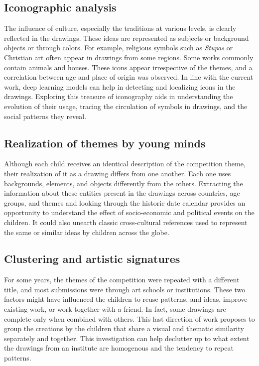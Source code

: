 \subsection{Iconographic analysis}
The influence of culture, especially the traditions at various levels, is clearly reflected in the drawings. These ideas are represented as subjects or background objects or through colors. For example, religious symbols such as \textit{Stupas} or Christian art often appear in drawings from some regions. Some works commonly contain animals and houses. These icons appear irrespective of the themes, and a correlation between age and place of origin was observed. In line with the current work, deep learning models can help in detecting and localizing icons in the drawings. Exploring this treasure of iconography aids in understanding the evolution of their usage, tracing the circulation of symbols in drawings, and the social patterns they reveal. 

\subsection{Realization of themes by young minds}
Although each child receives an identical description of the competition theme, their realization of it as a drawing differs from one another. Each one uses backgrounds, elements, and objects differently from the others. Extracting the information about these entities present in the drawings across countries, age groups, and themes and looking through the historic date calendar provides an opportunity to understand the effect of socio-economic and political events on the children. It could also unearth classic cross-cultural references used to represent the same or similar ideas by children across the globe.

\subsection{Clustering and artistic signatures}
For some years, the themes of the competition were repeated with a different title, and most submissions were through art schools or institutions. These two factors might have influenced the children to reuse patterns, and ideas, improve existing work, or work together with a friend. In fact, some drawings are complete only when combined with others. This last direction of work proposes to group the creations by the children that share a visual and thematic similarity separately and together. This investigation can help declutter up to what extent the drawings from an institute are homogenous and the tendency to repeat patterns.